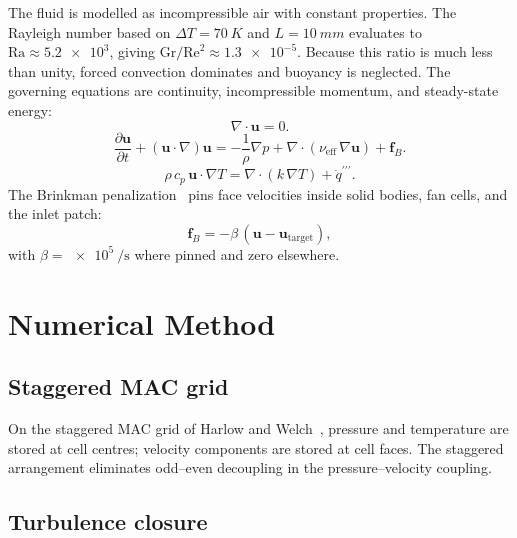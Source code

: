 \documentclass[10pt,twocolumn,letterpaper]{article}
\newcommand{\ubf}{\mathbf{u}}
\newcommand{\fB}{\mathbf{f}_{B}}
\newcommand{\uT}{\mathbf{u}_{\mathrm{target}}}
\newcommand{\nueff}{\nu_{\mathrm{eff}}}
\newcommand{\qsrc}{\dot{q}^{\prime\prime\prime}}
\newcommand{\Ra}{\mathrm{Ra}}
\newcommand{\Reyn}{\mathrm{Re}}
\newcommand{\Gr}{\mathrm{Gr}}
\begin{document}
The fluid is modelled as incompressible air with constant
properties. The Rayleigh number based on
$\Delta T = \SI{70}{K}$ and
$L = \SI{10}{mm}$ evaluates to $\Ra \approx \num{5.2e3}$, giving
$\Gr/\Reyn^{2} \approx \num{1.3e-5}$. Because this ratio is much
less than unity, forced convection dominates and buoyancy is
neglected. The governing equations are continuity, incompressible
momentum, and steady-state energy:
%
\begin{equation}
  \nabla\cdot\ubf = 0.
  \label{eq:continuity}
\end{equation}
%
\begin{equation}
  \frac{\partial \ubf}{\partial t}
  + (\ubf\cdot\nabla)\ubf
  = -\frac{1}{\rho}\nabla p
    + \nabla\!\cdot\!(\nueff\,\nabla\ubf)
    + \fB.
  \label{eq:momentum}
\end{equation}
%
\begin{equation}
  \rho\,c_{p}\,\ubf\cdot\nabla T
  = \nabla\!\cdot\!(k\,\nabla T) + \qsrc.
  \label{eq:energy}
\end{equation}
%
The Brinkman penalization~\cite{angot1999} pins face velocities
inside solid bodies, fan cells, and the inlet patch:
%
\begin{equation}
  \fB = -\beta\,(\ubf - \uT),
  \label{eq:brinkman}
\end{equation}
%
with $\beta = \SI{e5}{\per\second}$ where pinned and zero elsewhere.

\section{Numerical Method}
\label{sec:num}

\subsection{Staggered MAC grid}

On the staggered MAC grid of Harlow and Welch~\cite{harlow1965},
pressure and temperature are stored at cell centres; velocity
components are stored at cell faces. The staggered arrangement
eliminates odd--even decoupling in the pressure--velocity coupling.

\subsection{Turbulence closure}
\end{document}
